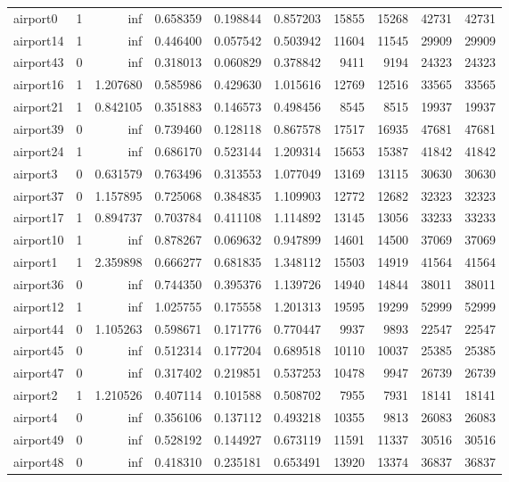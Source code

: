 \begin{longtable}{|l|r|r|r|r|r|r|r|r|r|}
airport0 & 1 & inf & 0.658359 & 0.198844 & 0.857203 & 15855 & 15268 & 42731 & 42731 \\
airport14 & 1 & inf & 0.446400 & 0.057542 & 0.503942 & 11604 & 11545 & 29909 & 29909 \\
airport43 & 0 & inf & 0.318013 & 0.060829 & 0.378842 & 9411 & 9194 & 24323 & 24323 \\
airport16 & 1 & 1.207680 & 0.585986 & 0.429630 & 1.015616 & 12769 & 12516 & 33565 & 33565 \\
airport21 & 1 & 0.842105 & 0.351883 & 0.146573 & 0.498456 & 8545 & 8515 & 19937 & 19937 \\
airport39 & 0 & inf & 0.739460 & 0.128118 & 0.867578 & 17517 & 16935 & 47681 & 47681 \\
airport24 & 1 & inf & 0.686170 & 0.523144 & 1.209314 & 15653 & 15387 & 41842 & 41842 \\
airport3 & 0 & 0.631579 & 0.763496 & 0.313553 & 1.077049 & 13169 & 13115 & 30630 & 30630 \\
airport37 & 0 & 1.157895 & 0.725068 & 0.384835 & 1.109903 & 12772 & 12682 & 32323 & 32323 \\
airport17 & 1 & 0.894737 & 0.703784 & 0.411108 & 1.114892 & 13145 & 13056 & 33233 & 33233 \\
airport10 & 1 & inf & 0.878267 & 0.069632 & 0.947899 & 14601 & 14500 & 37069 & 37069 \\
airport1 & 1 & 2.359898 & 0.666277 & 0.681835 & 1.348112 & 15503 & 14919 & 41564 & 41564 \\
airport36 & 0 & inf & 0.744350 & 0.395376 & 1.139726 & 14940 & 14844 & 38011 & 38011 \\
airport12 & 1 & inf & 1.025755 & 0.175558 & 1.201313 & 19595 & 19299 & 52999 & 52999 \\
airport44 & 0 & 1.105263 & 0.598671 & 0.171776 & 0.770447 & 9937 & 9893 & 22547 & 22547 \\
airport45 & 0 & inf & 0.512314 & 0.177204 & 0.689518 & 10110 & 10037 & 25385 & 25385 \\
airport47 & 0 & inf & 0.317402 & 0.219851 & 0.537253 & 10478 & 9947 & 26739 & 26739 \\
airport2 & 1 & 1.210526 & 0.407114 & 0.101588 & 0.508702 & 7955 & 7931 & 18141 & 18141 \\
airport4 & 0 & inf & 0.356106 & 0.137112 & 0.493218 & 10355 & 9813 & 26083 & 26083 \\
airport49 & 0 & inf & 0.528192 & 0.144927 & 0.673119 & 11591 & 11337 & 30516 & 30516 \\
airport48 & 0 & inf & 0.418310 & 0.235181 & 0.653491 & 13920 & 13374 & 36837 & 36837 \\

\end{longtable}
